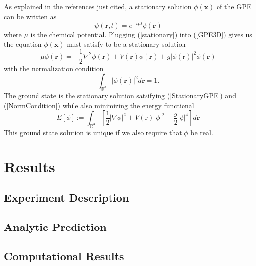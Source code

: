 \documentclass[12]{article}
\begin{document}
As explained in the references just cited, a stationary solution $\phi(\textbf{x})$ of the GPE can be written as
\begin{equation}
\psi(\textbf{r},t)  = e^{-i\mu t}\phi(\textbf{r})
\label{stationary}
\end{equation}
where $\mu$ is the chemical potential. Plugging (\ref{stationary}) into (\ref{GPE3D}) gives us the equation $\phi(\textbf{x})$ must satisfy to be a stationary solution
\begin{equation}
\mu \phi(\mathbf{r})=-\frac{1}{2} \nabla^{2} \phi(\mathbf{r})+V(\mathbf{r}) \phi(\mathbf{r})+ g|\phi(\mathbf{r})|^{2} \phi(\mathbf{r})
\label{StationaryGPE}
\end{equation}
with the normalization condition
\begin{equation}
\int_{\mathbb{R}^{3}}|\phi(\mathbf{r})|^{2} d \mathbf{r}=1.
\label{NormCondition}
\end{equation}
The ground state is the stationary solution satsifying (\ref{StationaryGPE}) and (\ref{NormCondition}) while also minimizing the energy functional
\begin{equation}
E[\phi] := \int_{\mathbb{R}^{3}} \left[ \frac1{2} |\nabla \phi|^{2}  + V(\textbf{r})|\phi|^{2} + \frac{g}{2}|\phi|^{4} \right] d \mathbf{r}
\end{equation}
This ground state solution is unique if we also require that $\phi$ be real.



\section{Results}

\subsection{Experiment Description}

\subsection{Analytic Prediction}

\subsection{Computational Results}



\end{document}
